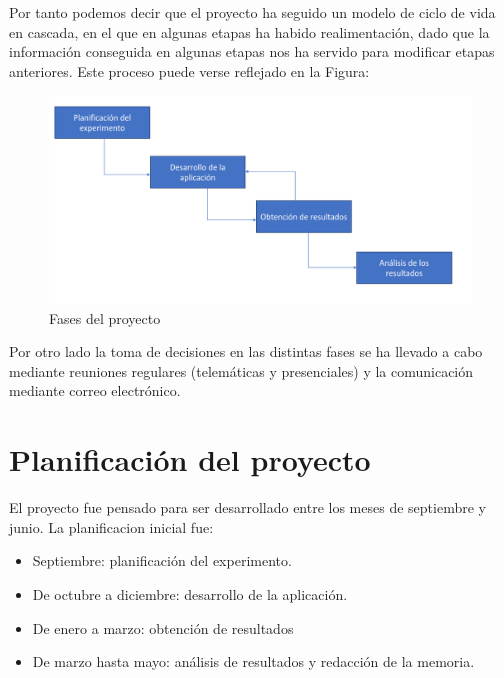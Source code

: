 \documentclass[a4paper,11pt, oneside]{book}
\begin{document}
Por tanto podemos decir que el proyecto ha seguido un modelo de ciclo de vida en cascada, en el que en algunas etapas ha habido realimentación, dado que la información conseguida en algunas etapas nos ha servido para modificar etapas anteriores. Este proceso puede verse reflejado en la Figura:

\begin{figure}[H]
	
	\centering
	\includegraphics[width=\linewidth]{diagrama-fases}
	\caption{Fases del proyecto}
	\label{fig:figura1}
	
\end{figure}

Por otro lado la toma de decisiones en las distintas fases se ha llevado a cabo mediante reuniones regulares (telemáticas y presenciales) y la comunicación mediante correo electrónico.

\section{Planificación del proyecto}
El proyecto fue pensado para ser desarrollado entre los meses de septiembre y junio. La planificacion inicial fue:
\begin{itemize}
	\item Septiembre: planificación del experimento.
	\item De octubre a diciembre: desarrollo de la aplicación.
	\item De enero a marzo: obtención de resultados
	\item De marzo hasta mayo: análisis de resultados y redacción de la memoria.
\end{itemize}
\end{document}
